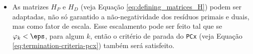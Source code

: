 \label{chap:final_remarks}






\begin{itemize}
 
    


\item As matrizes $H_P$ e $H_D$ (veja Equação
\eqref{eq:defining_matrices_H}) podem ser adaptadas, não só garantido a
não-negatividade dos resíduos primais e duais, mas como fator de escala.
Esse escalamento pode ser feito tal que se
$\varphi_k<\eps$, para algum $k$, então o critério de parada do 
\texttt{PCx} (veja Equação \eqref{eq:termination-criteria-pcx}) também será
satisfeito.
\end{itemize}


